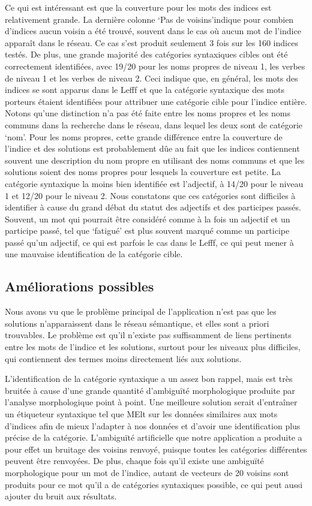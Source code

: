 Ce qui est intéressant est que la couverture pour les mots des indices est relativement grande. La dernière colonne \lq{Pas de voisins}\rq indique pour combien d'indices aucun voisin a été trouvé, souvent dans le cas où aucun mot de l'indice apparaît dans le réseau. Ce cas s'est produit seulement 3 fois sur les 160 indices testés. De plus, une grande majorité des catégories syntaxiques cibles ont été correctement identifiées, avec 19/20 pour les noms propres de niveau 1, les verbes de niveau 1 et les verbes de niveau 2. Ceci indique que, en général, les mots des indices se sont apparus dans le Lefff et que la catégorie syntaxique des mots porteurs étaient identifiées pour attribuer une catégorie cible pour l'indice entière. Notons qu'une distinction n'a pas été faite entre les noms propres et les noms communs dans la recherche dans le réseau, dans lequel les deux sont de catégorie \lq{nom}\rq. Pour les noms propres, cette grande différence entre la couverture de l'indice et des solutions est probablement dûe au fait que les indices contiennent souvent une description du nom propre en utilisant des noms communs et que les solutions soient des noms propres pour lesquels la couverture est petite. La catégorie syntaxique la moins bien identifiée est l'adjectif, à 14/20 pour le niveau 1 et 12/20 pour le niveau 2. Nous constatons que ces catégories sont difficiles à identifier à cause du grand débat du statut des adjectifs et des participes passés. Souvent, un mot qui pourrait être considéré comme à la fois un adjectif et un participe passé, tel que \lq{fatigué}\rq{} est plus souvent marqué comme un participe passé qu'un adjectif, ce qui est parfois le cas dans le Lefff, ce qui peut mener à une mauvaise identification de la catégorie cible. 
   
\subsection{Améliorations possibles}
Nous avons vu que le problème principal de l'application n'est pas que les solutions n'apparaissent dans le réseau sémantique, et elles sont a priori trouvables. Le problème est qu'il n'existe pas suffisamment de liens pertinents entre les mots de l'indice et les solutions, surtout pour les niveaux plus difficiles, qui contiennent des termes moins directement liés aux solutions.

L'identification de la catégorie syntaxique a un assez bon rappel, mais est très bruitée à cause d'une grande quantité d'ambiguïté morphologique produite par l'analyse morphologique point à point. Une meilleure solution serait d'entraîner un étiqueteur syntaxique tel que MElt sur les données similaires aux mots d'indices afin de mieux l'adapter à nos données et d'avoir une identification plus précise de la catégorie. L'ambiguïté artificielle que notre application a produite a pour effet un bruitage des voisins renvoyé, puisque toutes les catégories différentes peuvent être renvoyées. De plus, chaque fois qu'il existe une ambiguïté morphologique pour un mot de l'indice, autant de vecteurs de 20 voisins sont produits pour ce mot qu'il a de catégories syntaxiques possible, ce qui peut aussi ajouter du bruit aux résultats.

